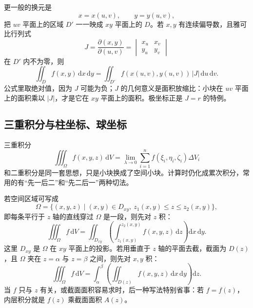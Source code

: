 更一般的换元是
\[
    x=x(u,v),\qquad y=y(u,v),
\]
把 $uv$ 平面上的区域 $D'$ 一一映成 $xy$ 平面上的 $D$。若 $x,y$ 有连续偏导数，且雅可比行列式
\[
    J=\frac{\partial(x,y)}{\partial(u,v)}
    =\begin{vmatrix}
        x_u & x_v\\ y_u & y_v
    \end{vmatrix}
\]
在 $D'$ 内不为零，则
\[
    \iint_D f(x,y)\,\mathrm dx\,\mathrm dy
    =\iint_{D'} f(x(u,v),y(u,v))\,|J|\,\mathrm du\,\mathrm dv .
\]
公式里取绝对值，因为 $J$ 可能为负；$J$ 的几何意义是面积放缩比：小块在 $uv$ 平面上的面积乘以 $|J|$，才是它在 $xy$ 平面上的面积。极坐标正是 $J=r$ 的特例。

\subsection{三重积分与柱坐标、球坐标}

三重积分
\[
    \iiint_\Omega f(x,y,z)\,\mathrm dV
    =\lim_{\lambda\to0}\sum_{i=1}^{n}f(\xi_i,\eta_i,\zeta_i)\Delta V_i
\]
和二重积分是同一套思想，只是小块换成了空间小块。计算时仍化成累次积分，常用的有“先一后二”和“先二后一”两种切法。

若空间区域可写成
\[
    \Omega=\{(x,y,z)\mid (x,y)\in D_{xy},\ z_1(x,y)\le z\le z_2(x,y)\},
\]
即每条平行于 $z$ 轴的直线穿过 $\Omega$ 是一段，则先对 $z$ 积：
\[
    \iiint_\Omega f\,\mathrm dV
    =\iint_{D_{xy}}\left(\int_{z_1(x,y)}^{z_2(x,y)}f(x,y,z)\,\mathrm dz\right)\mathrm dx\,\mathrm dy .
\]
这里 $D_{xy}$ 是 $\Omega$ 在 $xy$ 平面上的投影。若用垂直于 $z$ 轴的平面去截，截面为 $D(z)$，且 $\Omega$ 夹在 $z=\alpha$ 与 $z=\beta$ 之间，则先对 $x,y$ 积：
\[
    \iiint_\Omega f\,\mathrm dV
    =\int_\alpha^\beta\left(\iint_{D(z)}f(x,y,z)\,\mathrm dx\,\mathrm dy\right)\mathrm dz .
\]
当 $f$ 只与 $z$ 有关，或截面面积容易求时，后一种写法特别省事：若 $f=f(z)$，内层积分就是 $f(z)$ 乘截面面积 $A(z)$。


